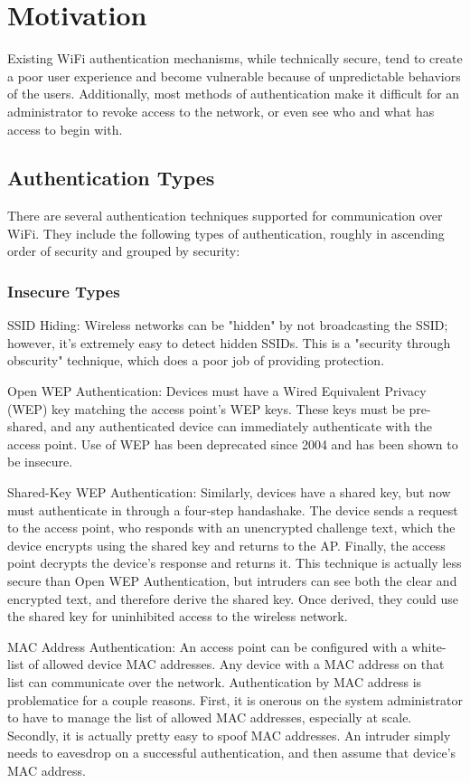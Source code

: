\section{Motivation}
\label{section:motivation}
Existing WiFi authentication mechanisms, while technically secure, tend to create a poor user
experience and become vulnerable because of unpredictable behaviors of the users. Additionally,
most methods of authentication make it difficult for an administrator to revoke access to the
network, or even see who and what has access to begin with.

\subsection{Authentication Types}
There are several authentication techniques supported for communication over WiFi. They include
the following types of authentication, roughly in ascending order of security and grouped by security:
 \cite{WifiAuthenticationTypes} \cite{wiki:WirelessSecurity}

\subsubsection{Insecure Types}
\begin{description}
  \item{SSID Hiding:} Wireless networks can be "hidden" by not broadcasting the SSID; however,
  it's extremely easy to detect hidden SSIDs. This is a "security through obscurity" technique,
  which does a poor job of providing protection.
  \item{Open WEP Authentication:} Devices must have a Wired Equivalent Privacy (WEP) key matching
  the access point's WEP keys. These keys must be pre-shared, and any authenticated device can
  immediately authenticate with the access point. Use of WEP has been deprecated since 2004 and has
  been shown to be insecure.
  \item{Shared-Key WEP Authentication:} Similarly, devices have a shared key, but now must
  authenticate in through a four-step handashake. The device sends a request to the access point,
  who responds with an unencrypted challenge text, which the device encrypts using the shared key
  and returns to the AP. Finally, the access point decrypts the device's response and returns it.
  This technique is actually less secure than Open WEP Authentication, but intruders can see both
  the clear and encrypted text, and therefore derive the shared key. Once derived, they could use
  the shared key for uninhibited access to the wireless network.
  \item{MAC Address Authentication:} An access point can be configured with a white-list of allowed
  device MAC addresses. Any device with a MAC address on that list can communicate over the network.
  Authentication by MAC address is problematice for a couple reasons. First, it is onerous on the
  system administrator to have to manage the list of allowed MAC addresses, especially at scale.
  Secondly, it is actually pretty easy to spoof MAC addresses. An intruder simply needs to eavesdrop
  on a successful authentication, and then assume that device's MAC address.
\end{description}


